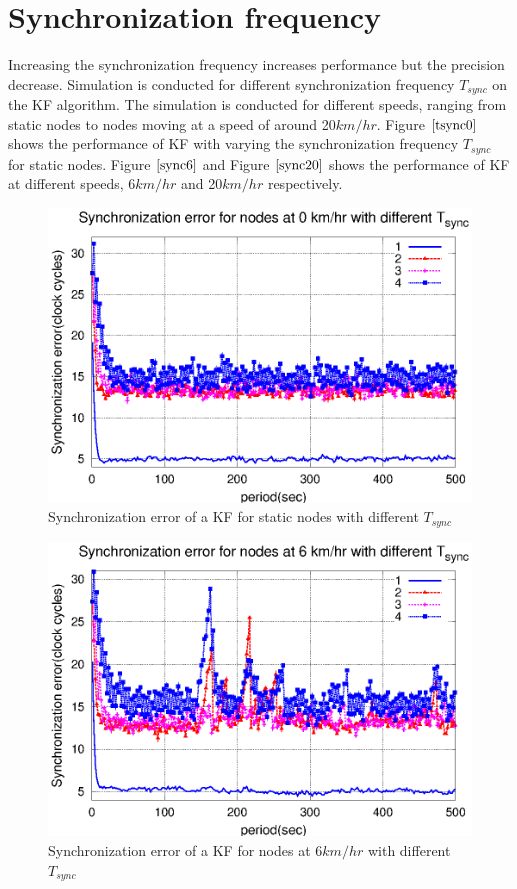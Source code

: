 \documentclass[a4paper,10pt]{report}
\begin{document}
\section{\textbf{Synchronization frequency}}
Increasing the synchronization frequency increases performance but the precision decrease. Simulation is conducted for different synchronization frequency $T_{sync}$ on the KF algorithm. The simulation is conducted for different speeds, ranging from static nodes to nodes moving at a speed of around 20$km/hr$. 
\newline
Figure $\ref{tsync0}$ shows the performance of KF with varying the synchronization frequency $T_{sync}$ for static nodes. Figure $\ref{sync6}$ and Figure $\ref{sync20}$ shows the performance of KF at different speeds, 6$km/hr$ and 20$km/hr$ respectively.
\begin{figure}[!h]
\centering
\includegraphics[width= 0.7 \textwidth]{tsync0}
\caption{Synchronization error of a KF for static nodes with different $T_{sync}$} \label{tsync0}
\end{figure}
\begin{figure}[!h]
\centering
\includegraphics[width= 0.7 \textwidth]{tsync6}
\caption{Synchronization error of a KF for nodes at 6$km/hr$ with different $T_{sync}$} \label{tsync6}
\end{figure}
\end{document}
